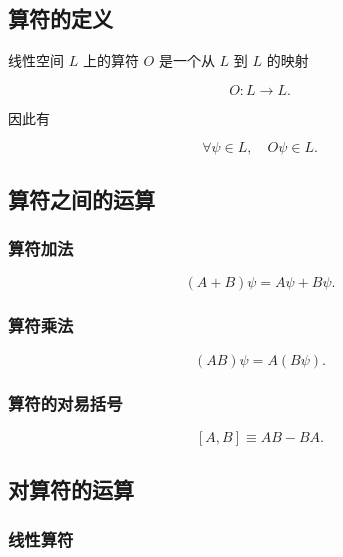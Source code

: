 \subsection{算符的定义}

线性空间 $L $ 上的算符 $O $ 是一个从 $L $ 到 $L $ 的映射

\begin{equation}
O : L \to L.
\end{equation}

因此有

\begin{equation}
\forall \psi \in L,\quad
O \psi \in L.
\end{equation}

\subsection{算符之间的运算}

\subsubsection{算符加法}

\begin{equation}
(A+B) \psi = A \psi + B \psi.
\end{equation}

\subsubsection{算符乘法}

\begin{equation}
(AB) \psi = A(B \psi).
\end{equation}

\subsubsection{算符的对易括号}

\begin{equation}
\left[A , B \right]
\equiv AB - BA.
\end{equation}

\subsection{对算符的运算}

\subsubsection{线性算符}

